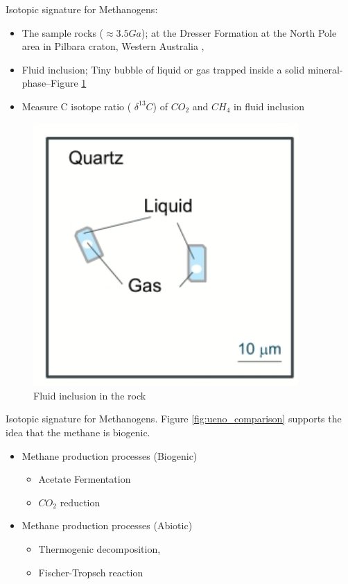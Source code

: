 \documentclass[]{article}
\begin{document}
Isotopic signature for Methanogens:
\begin{itemize}
	\item The sample rocks ($\approx 3.5Ga$); at the Dresser Formation at the North Pole area in Pilbara craton, Western Australia \cite{ueno2006evidence},
	\item Fluid inclusion; Tiny bubble of liquid or gas trapped inside a solid mineral-phase--Figure \ref{fig:FluidInclusionInTheRock}
	\item Measure C isotope ratio ( $\delta^{13}C$) of $CO_2$ and $CH_4$ in fluid inclusion
\end{itemize}

\begin{figure}[H]
	\caption{Fluid inclusion in the rock}\label{fig:FluidInclusionInTheRock}
	\includegraphics[width=0.9\textwidth]{FluidInclusionInTheRock}
\end{figure}

Isotopic signature for Methanogens. Figure \ref{fig:ueno_comparison} supports the idea that the methane is biogenic.
\begin{itemize}
	\item Methane production processes (Biogenic)
	\begin{itemize}
		\item 	Acetate Fermentation
		\item $CO_2$ reduction
	\end{itemize}
	\item Methane production processes (Abiotic)
	\begin{itemize}
		\item Thermogenic decomposition,
		\item Fischer-Tropsch reaction
	\end{itemize}
\end{itemize}
\end{document}
